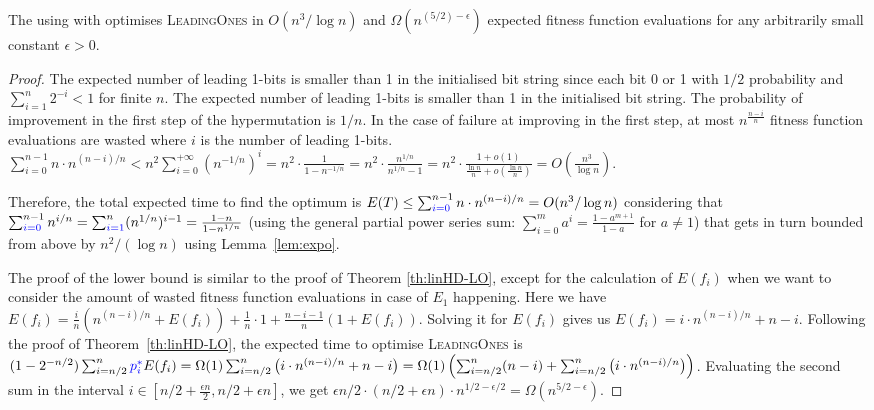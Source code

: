 \documentclass[lettersize,journal]{IEEEtran}
\begin{document}
\begin{theorem} \label{expohdOnLO}
The {\oneoneIA } using \IPHfcm{} with {\expoF } optimises \textsc{LeadingOnes} in $O(n^3/\log n)$ and 
$\Omega(n^{(5/2)-\epsilon})$  expected fitness function evaluations for any 
arbitrarily small constant $\epsilon>0$. 
\end{theorem}

\begin{proof}
{\color{blue} The expected number of leading 1-bits is smaller than 1 in the initialised bit 
	string since each bit 0 or 1 with $1/2$ probability and $\sum^{n}_{i=1}2^{-i}<1$ for finite $n$.} The expected number of leading 1-bits is smaller than 1 in the initialised bit 
string. The probability of improvement in the first step {\color{blue} of the hypermutation} is $1/n$. In the case of 
failure at improving in the first step, at most $n^{\frac{n-i}{n}}$ fitness 
function evaluations are wasted where $i$ is the number of leading 
1-bits. {\color{blue}$\sum_{i = 0}^{n - 1} n \cdot n^{(n - i) / n} < n^2 \sum_{i = 0}^{+\infty}(n^{-1/n})^i = n^2 \cdot \frac{1}{1 - n^{-1/n}} = n^2 \cdot \frac{n^{1/n}}{n^{1/n} - 1} = n^2 \cdot \frac{1 + o(1)}{\frac{\ln{n}}{n} + o(\frac{\ln{n}}{n})} = O(\frac{n^3}{\log{n}})$. }

Therefore, the total expected time to find the optimum is  $E(T) \leq 
\sum_{{\color{blue}i=0}}^{n-1} n \cdot n^{(n-i)/n}=O( n^3/\log n)$ considering that $ 
\sum_{{\color{blue}i=0}}^{n-1} n^{i/n}= \sum_{{\color{blue}i=1}}^n (n^{1/n})^{i-1}=\frac{1-n}{1-n^{1/n}}$ (using the general partial power series sum: $\sum_{i=0}^{m}a^{i}=\frac{1-a^{m+1}}{1-a}$ for $a\neq 1$)  that gets in turn bounded from above by $n^2/(\log n)$ using Lemma~\ref{lem:expo}.


The proof of the lower bound is similar to the proof of Theorem \ref{th:linHD-LO}, except for the calculation of $E(f_i)$ when we want to consider the amount of wasted fitness function evaluations in case of $E_1$ happening. Here we have $ E(f_i) = \frac{i}{n} \left( n^{(n-i)/n}+ E(f_i)\right) + \frac{1}{n} \cdot 1 +\frac{n-i-1}{n} \left( 1+ E(f_i)\right)$. Solving it for $E(f_i)$ gives us $E(f_i)=i\cdot n^{(n-i)/n}+n-i$. 
{\color{blue}Following the proof of Theorem~\ref{th:linHD-LO}}, the expected time to optimise \textsc{LeadingOnes} is 
$(1-2^{-n/2})\sum_{i=n/2}^{n} {\color{blue}p_{i}^{*}} E(f_i)=\Omega(1) \sum_{i=n/2}^{n} 
\left(i\cdot n^{(n-i)/n}+n-i \right)=\Omega(1)\left( \sum_{i=n/2}^{n} (n-i)+ 
\sum_{i=n/2}^{n} \left(i\cdot n^{(n-i)/n}\right)\right)$. Evaluating the second 
sum in the interval $i\in [n/2+\frac{\epsilon n}{2}, n/2+\epsilon n]$, we get $\epsilon 
n/2 \cdot (n/2 + \epsilon n)  \cdot 
n^{1/2-\epsilon/2}=\Omega(n^{5/2-\epsilon})$.
\end{proof}
\end{document}
